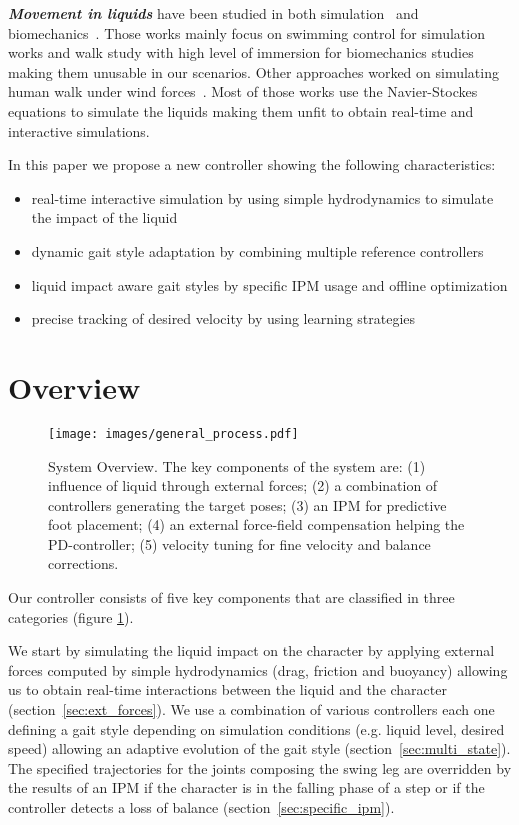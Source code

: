 \documentclass[conference]{acmsiggraph}
\begin{document}
\textbf{\textit{Movement in liquids}} have been studied in both simulation~\cite{yang2004layered,si2014realistic} and biomechanics~\cite{barela2006biomechanical,chevutschi2009comparison}. Those works mainly focus on swimming control for simulation works and walk study with high level of immersion for biomechanics studies making them unusable in our scenarios. Other approaches worked on simulating human walk under wind forces~\cite{lentine2011creature}. Most of those works use the Navier-Stockes equations to simulate the liquids making them unfit to obtain real-time and interactive simulations.

In this paper we propose a new controller showing the following characteristics:
\begin{itemize}
\item{real-time interactive simulation by using simple hydrodynamics to simulate the impact of the liquid}
\item{dynamic gait style adaptation by combining multiple reference controllers}
\item{liquid impact aware gait styles by specific IPM usage and offline optimization}
\item{precise tracking of desired velocity by using learning strategies}
\end{itemize}

\section{Overview}
\label{sec:overview}

\begin{figure}[t]
\centering
\texttt{[image: images/general\_process.pdf]}
\caption{System Overview. The key components of the system are: (1) influence of liquid through external forces; (2) a combination of controllers generating the target poses; (3) an IPM for predictive foot placement; (4) an external force-field compensation helping the PD-controller; (5) velocity tuning for fine velocity and balance corrections.}
\label{fig:shema_controler}
\end{figure}

Our controller consists of five key components that are classified in three categories (figure \ref{fig:shema_controler}).

We start by simulating the liquid impact on the character by applying external forces computed by simple hydrodynamics (drag, friction and buoyancy) allowing us to obtain real-time interactions between the liquid and the character (section~\ref{sec:ext_forces}).
We use a combination of various controllers each one defining a gait style depending on simulation conditions (e.g. liquid level, desired speed) allowing an adaptive evolution of the gait style (section~\ref{sec:multi_state}). The specified trajectories for the joints composing the swing leg are overridden by the results of an IPM if the character is in the falling phase of a step or if the controller detects a loss of balance (section~\ref{sec:specific_ipm}).
\end{document}
